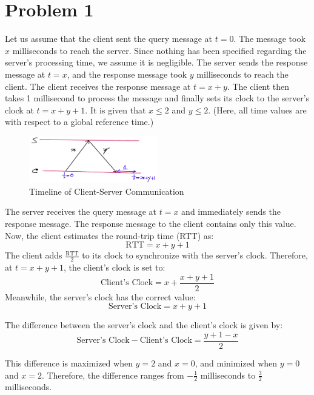 \section{Problem 1}\label{prob1}
Let us assume that the client sent the query message at \( t = 0 \). The message took \( x \) milliseconds to reach the server. Since nothing has been specified regarding the server's processing time, we assume it is negligible. The server sends the response message at \( t = x \), and the response message took \( y \) milliseconds to reach the client. The client receives the response message at \( t = x + y \). The client then takes 1 millisecond to process the message and finally sets its clock to the server's clock at \( t = x + y + 1 \). It is given that \( x \leq 2 \) and \( y \leq 2 \). (Here, all time values are with respect to a global reference time.)

\begin{figure}[h]
    \centering
    \includegraphics[width=0.5\textwidth]{IMG/Q1.jpeg}
    \caption{Timeline of Client-Server Communication}
    \label{fig:example}
\end{figure}

The server receives the query message at \( t = x \) and immediately sends the response message. The response message to the client contains only this value. Now, the client estimates the round-trip time (RTT) as:
\[
\text{RTT} = x + y + 1
\]
The client adds \( \frac{\text{RTT}}{2} \) to its clock to synchronize with the server's clock. Therefore, at \( t = x + y + 1 \), the client's clock is set to:
\[
\text{Client's Clock} = x + \frac{x + y + 1}{2}
\]
Meanwhile, the server's clock has the correct value:
\[
\text{Server's Clock} = x + y + 1
\]

The difference between the server's clock and the client's clock is given by:
\[
\text{Server's Clock} - \text{Client's Clock} = \frac{y + 1 - x}{2}
\]

This difference is maximized when \( y = 2 \) and \( x = 0 \), and minimized when \( y = 0 \) and \( x = 2 \). Therefore, the difference ranges from \( -\frac{1}{2} \) milliseconds to \( \frac{3}{2} \) milliseconds.

